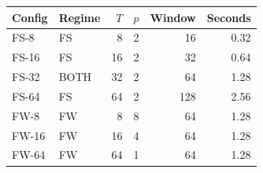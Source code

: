 \begin{tabular}{llrrrr}
\toprule
Config & Regime & $T$ & $p$ & Window & Seconds \\
\midrule
FS-8 & FS & 8 & 2 & 16 & 0.32 \\
FS-16 & FS & 16 & 2 & 32 & 0.64 \\
FS-32 & BOTH & 32 & 2 & 64 & 1.28 \\
FS-64 & FS & 64 & 2 & 128 & 2.56 \\
FW-8 & FW & 8 & 8 & 64 & 1.28 \\
FW-16 & FW & 16 & 4 & 64 & 1.28 \\
FW-64 & FW & 64 & 1 & 64 & 1.28 \\
\bottomrule
\end{tabular}
